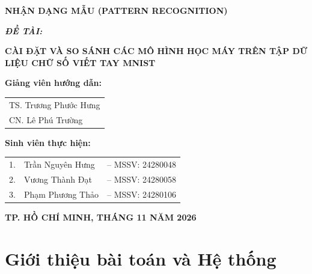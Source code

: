 \documentclass[11pt,a4paper]{article}
\begin{document}
\begin{titlepage}
\begin{center}
    \vspace{6pt}
    {\fontsize{16pt}{20pt}\selectfont \textbf{NHẬN DẠNG MẪU (PATTERN RECOGNITION)}}
\end{center}

\vspace{15pt}
\begin{center}
    {\fontsize{12pt}{15pt}\selectfont \textbf{\textsl{ĐỀ TÀI:}}}
    
    \vspace{8pt}
    {\fontsize{15pt}{19pt}\selectfont \textbf{\color{blue!80!black} CÀI ĐẶT VÀ SO SÁNH CÁC MÔ HÌNH HỌC MÁY TRÊN TẬP DỮ LIỆU CHỮ SỐ VIẾT TAY MNIST}}
\end{center}

\vspace{20pt}
\begin{flushleft}
    \fontsize{12pt}{16pt}\selectfont
    \hspace{1.5cm}\textbf{Giảng viên hướng dẫn:} \begin{tabular}[t]{@{}l@{}}
        TS. Trương Phước Hưng \\
        CN. Lê Phú Trường
    \end{tabular}
    
    \vspace{8pt}
    \hspace{1.5cm}\textbf{Sinh viên thực hiện:} \begin{tabular}[t]{@{}l l l@{}}
        1. & Trần Nguyên Hưng & -- MSSV: 24280048 \\
        2. & Vương Thành Đạt  & -- MSSV: 24280058 \\
        3. & Phạm Phương Thảo & -- MSSV: 24280106
    \end{tabular}
\end{flushleft}
\vfill
\begin{center}
    \textbf{\fontsize{11pt}{14pt}\selectfont TP. HỒ CHÍ MINH, THÁNG 11 NĂM 2026}
\end{center}
\vspace{10pt}
\end{titlepage}


\tableofcontents
\newpage

\section{Giới thiệu bài toán và Hệ thống}
\end{document}
